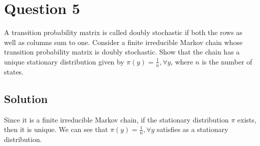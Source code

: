\section*{Question 5}

A transition probability matrix is called doubly stochastic if both the rows as well as columns sum to one.
Consider a finite irreducible Markov chain whose transition probability matrix is doubly stochastic.
Show that the chain has a unique stationary distribution given by \( \pi(y)=\frac{1}{n}, \forall y \), where \( n \) is the number of states.

\subsection*{Solution}

Since it is a finite irreducible Markov chain, if the stationary distribution \( \pi \) exists, then it is unique.
We can see that \( \pi(y)=\frac{1}{n}, \forall y \) satisfies as a stationary distribution.
